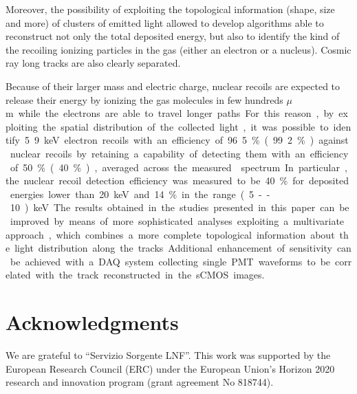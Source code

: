 \documentclass[12pt]{iopart}
\begin{document}
Moreover, the possibility of exploiting the topological information
(shape, size and more) of clusters of emitted light allowed to develop
algorithms able to reconstruct not only the total deposited energy,
but also to identify the kind of the recoiling ionizing particles in
the gas (either an electron or a nucleus). Cosmic ray long tracks are
also clearly separated.

Because of their larger mass and electric charge, nuclear recoils are
expected to release their energy by ionizing the gas molecules in few
hundreds \unit{$\mu$m} while the electrons are able to travel longer
paths. For this reason, by exploiting the spatial distribution of the
collected light, it was possible to identify 5.9\keV electron recoils
with an efficiency of 96.5\% (99.2\%) against nuclear recoils by
retaining a capability of detecting them with an efficiency of 50\%
(40\%), averaged across the measured \ambe spectrum.

In particular, the nuclear recoil detection efficiency was measured to
be 40\% for deposited energies lower than 20\keV and 14\% in the range
(5--10)\keV.

The results obtained in the studies presented in this paper can be
improved by means of more sophisticated analyses exploiting a
multivariate approach, which combines a more complete topological
information about the light distribution along the tracks.  Additional
enhancement of sensitivity can be achieved with a DAQ system
collecting single PMT waveforms to be correlated with the track
reconstructed in the sCMOS images.

\section{Acknowledgments}
We are grateful to ``Servizio Sorgente LNF''.  This work was supported
by the European Research Council (ERC) under the European Union’s
Horizon 2020 research and innovation program (grant agreement No
818744).



\end{document}
